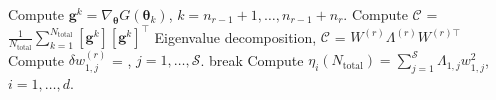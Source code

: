 \begin{breakablealgorithm}
\begin{algorithmic}[1]
		\State Compute $\bm{g}^k = \nabla_{\bm{\theta}}G(\bm\theta_k)$, 
             	$k=n_{r-1}+1, \ldots, n_{r-1}+n_r$.  
		\State Compute $\mathcal{C}$ = 
        	$\frac{1}{N_\text{total}}\sum\limits_{k=1}^{N_\text{total}}[\bm{g}^k][\bm{g}^k]^\top$
		\State Eigenvalue decomposition, $\mathcal{C}$ = $W^{(r)}\Lambda^{(r)} W^{(r)\top}$
		\State Compute $\delta w_{1,j}^{(r)}$ = 
                       , 
                       $j = 1,\ldots,\mathcal{S}$.
			\State break
		\EndIf
	\EndLoop
	\State Compute $\eta_i(N_\text{total}) = \sum\limits_{j=1}^{\mathcal{S}} \Lambda_{1,j}w_{1,j}^2$,
	$i=1,\ldots,d$.
	
    \EndProcedure
  \end{algorithmic}
  \label{alg:grad}
\end{breakablealgorithm}
\bigskip

